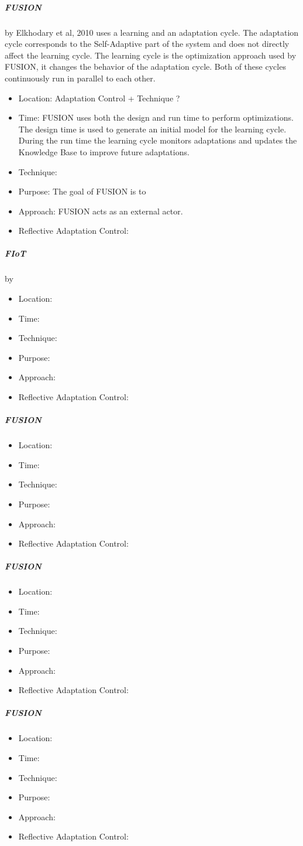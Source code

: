 \subparagraph*{FUSION}
by Elkhodary et al, 2010 \cite*{FUSION}  uses a learning and an adaptation cycle.
The adaptation cycle corresponds to the Self-Adaptive part of the system
and does not directly affect the learning cycle.
The learning cycle is the optimization approach used by FUSION,
it changes the behavior of the adaptation cycle.
Both of these cycles continuously run in parallel to each other.
\begin{itemize}
    \item Location: Adaptation Control + Technique ?
    \item Time: FUSION uses both the design and run time to perform optimizations.
    The design time is used to generate an initial model for the learning cycle.
    During the run time the learning cycle monitors adaptations
    and updates the Knowledge Base to improve future adaptations.
    \item Technique:
    \item Purpose: The goal of FUSION is to 
    \item Approach: FUSION acts as an external actor.
    \item Reflective Adaptation Control: 
\end{itemize}

\subparagraph*{FIoT}
by 
\begin{itemize}
    \item Location:
    \item Time:
    \item Technique:
    \item Purpose:
    \item Approach:
    \item Reflective Adaptation Control:
\end{itemize}

\subparagraph*{FUSION}
\begin{itemize}
    \item Location:
    \item Time:
    \item Technique:
    \item Purpose:
    \item Approach:
    \item Reflective Adaptation Control:
\end{itemize}

\subparagraph*{FUSION}
\begin{itemize}
    \item Location:
    \item Time:
    \item Technique:
    \item Purpose:
    \item Approach:
    \item Reflective Adaptation Control:
\end{itemize}

\subparagraph*{FUSION}
\begin{itemize}
    \item Location:
    \item Time:
    \item Technique:
    \item Purpose:
    \item Approach:
    \item Reflective Adaptation Control:
\end{itemize}